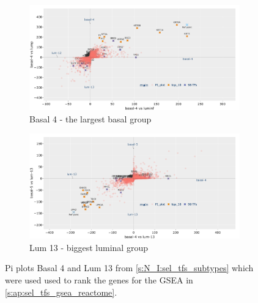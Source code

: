 \begin{figure}[H]
    \centering
    \begin{subfigure}[!t]{1.0\linewidth}
        \includegraphics[width=\textwidth,keepaspectratio]{Sections/Network_I/Resources/selective_pruning/pi_gsea/pi_largeBasal.png}
        \caption{Basal 4 - the largest basal group}
        \label{fig:ap:pi_basal}
    \end{subfigure}
    \begin{subfigure}[!t]{1.0\textwidth}
        \includegraphics[width=\textwidth,keepaspectratio]{Sections/Network_I/Resources/selective_pruning/pi_gsea/pi_largeLuminal.png}
        \caption{Lum 13 - biggest luminal group}
        \label{fig:ap:pi_lum}
    \end{subfigure}
    \caption[Basal 4 and Lum 13 pi plots]{Pi plots Basal 4 and Lum 13 from \cref{s:N_I:sel_tfs_subtypes} which were used used to rank the genes for the GSEA in \cref{s:ap:sel_tfs_gsea_reactome}.}
    \label{fig:ap:pi_other_values_I}
\end{figure}

